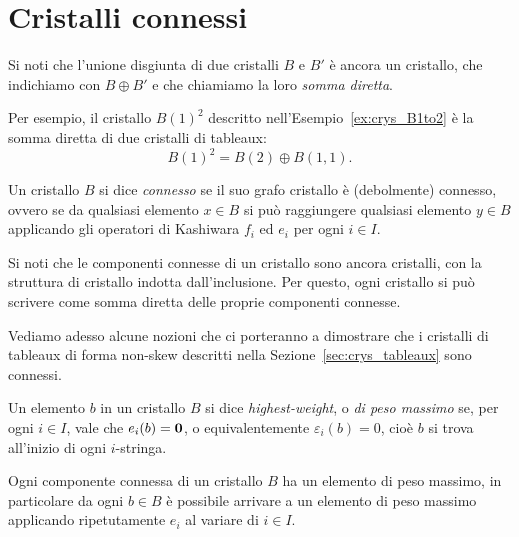 
\section{Cristalli connessi}
\label{sec:connessione_morfismi}

Si noti che l'unione disgiunta di due cristalli $B$ e $B'$ \`e ancora un cristallo,
che indichiamo con $B \oplus B'$ e che chiamiamo la loro \emph{somma diretta}.

\begin{example}
    Per esempio, il cristallo $B(1)^2$ descritto nell'Esempio~\ref{ex:crys_B1to2} \`e 
    la somma diretta di due cristalli di tableaux:
    \[
        B(1)^2 = B(2) \oplus B(1,1).
    \]
\end{example}

\begin{definition}
    Un cristallo $B$ si dice \emph{connesso} se il suo grafo cristallo \`e
    (debolmente) connesso,
    ovvero se da qualsiasi elemento $x \in B$ si pu\`o raggiungere qualsiasi elemento
    $y \in B$ applicando gli operatori di Kashiwara $f_i$ ed $e_i$ per ogni $i \in I$.
\end{definition}

Si noti che le componenti connesse di un cristallo sono ancora cristalli, con la struttura
di cristallo indotta dall'inclusione.
Per questo, ogni cristallo si pu\`o scrivere come somma diretta delle proprie componenti connesse.

Vediamo adesso alcune nozioni che ci porteranno a dimostrare che i cristalli
di tableaux di forma non-skew descritti nella Sezione~\ref{sec:crys_tableaux} sono connessi.

\begin{definition}
    Un elemento $b$ in un cristallo $B$ si dice \emph{highest-weight}, 
    o \emph{di peso massimo} se,
    per ogni $i \in I$, vale che $e_i(b) = \mathbf{0}$, o equivalentemente $\varepsilon_i(b) = 0$,
    cio\`e $b$ si trova all'inizio di ogni $i$-stringa.
\end{definition}

\begin{proposition}
    Ogni componente connessa di un cristallo $B$ ha un elemento di peso massimo,
    in particolare da ogni $b \in B$ \`e possibile arrivare a un elemento di 
    peso massimo applicando ripetutamente $e_i$ al variare di $i \in I$.
\end{proposition}


